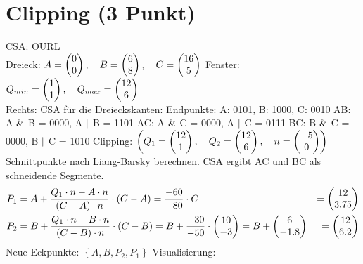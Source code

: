 \documentclass[a4paper,10pt,DIV=14]{article}
\begin{document}
\newpage
\section{Clipping (3 Punkt)}
CSA: OURL \\[.3cm]
Dreieck: $A = \begin{pmatrix} 0 \\ 0 \end{pmatrix}, \quad B = \begin{pmatrix} 6 \\ 8 \end{pmatrix}, \quad C = \begin{pmatrix} 16 \\ 5 \end{pmatrix}$ \newline
Fenster: $Q_{min} = \begin{pmatrix} 1 \\ 1 \end{pmatrix}, \quad Q_{max} = \begin{pmatrix} 12 \\ 6 \end{pmatrix}$ \\[.5cm]
Rechts: \newline
CSA für die Dreieckskanten: \newline
Endpunkte: A: 0101, B: 1000, C: 0010 \newline
AB: A $\mathrel{\&}$ B = 0000, A $\mathrel{|}$ B = 1101 \newline
AC: A $\mathrel{\&}$ C = 0000, A $\mathrel{|}$ C = 0111 \newline
BC: B $\mathrel{\&}$ C = 0000, B $\mathrel{|}$ C = 1010 \newline
Clipping: $\left(Q_1= \begin{pmatrix} 12 \\ 1 \end{pmatrix}, \quad Q_2= \begin{pmatrix} 12 \\ 6 \end{pmatrix}, \quad n = \begin{pmatrix} -5 \\ 0 \end{pmatrix} \right)$\newline
Schnittpunkte nach Liang-Barsky berechnen. CSA ergibt AC und BC als schneidende Segmente. \newline
\begin{align*}
P_1 &= A + \frac{Q_1 \cdot n - A \cdot n}{\left(C-A\right) \cdot n} \cdot \left(C-A\right) = \frac{-60}{-80} \cdot C &= \begin{pmatrix} 12 \\ 3.75 \end{pmatrix} \\
P_2 &= B + \frac{Q_1 \cdot n - B \cdot n}{\left(C-B\right) \cdot n} \cdot \left(C-B\right) = B + \frac{-30}{-50} \cdot \begin{pmatrix} 10 \\ -3 \end{pmatrix} = B + \begin{pmatrix} 6 \\ -1.8 \end{pmatrix} &= \begin{pmatrix} 12 \\ 6.2 \end{pmatrix}
\end{align*}
Neue Eckpunkte: $\left\lbrace A, B, P_2, P_1 \right\rbrace $ \newline
Visualisierung: \newline
\begin{center}
\end{center}
\end{document}
